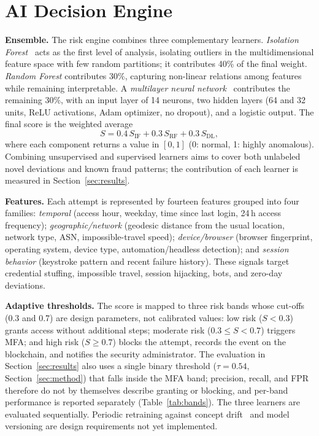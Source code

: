 \documentclass[conference]{IEEEtran}
\begin{document}
\section{AI Decision Engine}
\label{sec:ai}
\textbf{Ensemble.} The risk engine combines three complementary
learners. \emph{Isolation Forest}~\cite{liu2008} acts as the first
level of analysis, isolating outliers in the multidimensional feature
space with few random partitions; it contributes 40\% of the final
weight. \emph{Random Forest} contributes 30\%, capturing non-linear
relations among features while remaining interpretable. A
\emph{multilayer neural network}~\cite{goodfellow2016} contributes the
remaining 30\%, with an input layer of 14 neurons, two hidden layers
(64 and 32 units, ReLU activations, Adam optimizer, no dropout), and a
logistic output. The final score is the weighted average
\begin{equation}
S = 0.4\,S_{\mathrm{IF}} + 0.3\,S_{\mathrm{RF}} + 0.3\,S_{\mathrm{DL}},
\label{eq:ensemble}
\end{equation}
where each component returns a value in $[0,1]$ (0: normal, 1: highly
anomalous). Combining unsupervised and supervised learners aims to
cover both unlabeled novel deviations and known fraud patterns; the
contribution of each learner is measured in Section~\ref{sec:results}.

\textbf{Features.} Each attempt is represented by fourteen features
grouped into four families: \emph{temporal} (access hour, weekday, time since last login, 24\,h access frequency);
\emph{geographic/network} (geodesic distance from the usual location,
network type, ASN, impossible-travel speed); \emph{device/browser}
(browser fingerprint, operating system, device type,
automation/headless detection); and \emph{session behavior} (keystroke
pattern and recent failure history). These signals target credential
stuffing, impossible travel, session hijacking, bots, and
zero-day deviations.

\textbf{Adaptive thresholds.} The score is mapped to three risk bands
whose cut-offs (0.3 and 0.7) are design parameters, not calibrated
values: low risk
($S<0.3$) grants access without additional steps; moderate risk
($0.3\le S<0.7$) triggers MFA; and high risk ($S\ge0.7$) blocks the
attempt, records the event on the blockchain, and notifies the security
administrator. The evaluation in Section~\ref{sec:results} also uses a
single binary threshold ($\tau=0.54$, Section~\ref{sec:method}) that
falls inside the MFA band; precision, recall, and FPR therefore do not by
themselves describe granting or blocking, and per-band performance is
reported separately (Table~\ref{tab:bands}).
The three learners are evaluated sequentially. Periodic retraining
against concept drift~\cite{gama2014} and model versioning are design
requirements not yet implemented.
\end{document}
